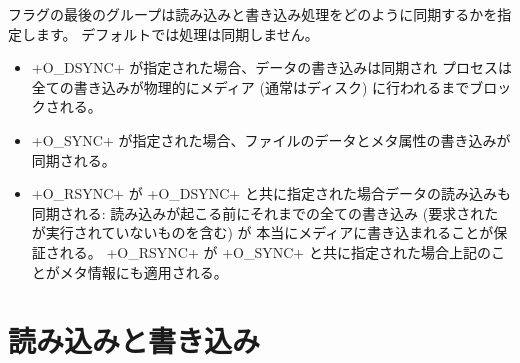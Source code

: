 フラグの最後のグループは読み込みと書き込み処理をどのように同期するかを指定します。
デフォルトでは処理は同期しません。
\begin{itemize}
\item \ml+O_DSYNC+ が指定された場合、データの書き込みは同期され
  プロセスは全ての書き込みが物理的にメディア (通常はディスク) に行われるまでブロックされる。
%
\item \ml+O_SYNC+ が指定された場合、ファイルのデータとメタ属性の書き込みが同期される。
%
  \item \ml+O_RSYNC+ が \ml+O_DSYNC+ と共に指定された場合データの読み込みも同期される:
    読み込みが起こる前にそれまでの全ての書き込み (要求されたが実行されていないものを含む) が
    本当にメディアに書き込まれることが保証される。
    \ml+O_RSYNC+ が \ml+O_SYNC+ と共に指定された場合上記のことがメタ情報にも適用される。
\end{itemize}


\section{読み込みと書き込み}

